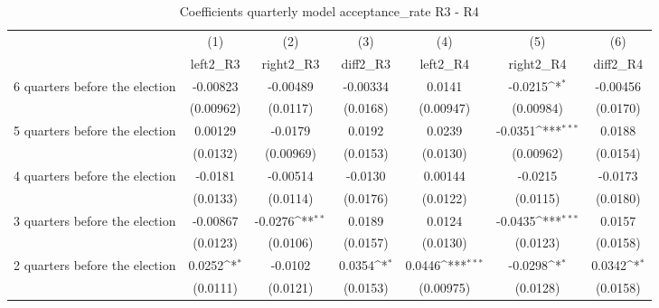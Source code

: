 \begin{table}[!ht]\centering \footnotesize
\def\sym#1{\ifmmode^{#1}\else\(^{#1}\)\fi}
\caption{Coefficients quarterly model acceptance\_rate R3 - R4}
\begin{tabular}{l*{6}{c}}
\hline\hline
                    &\multicolumn{1}{c}{(1)}&\multicolumn{1}{c}{(2)}&\multicolumn{1}{c}{(3)}&\multicolumn{1}{c}{(4)}&\multicolumn{1}{c}{(5)}&\multicolumn{1}{c}{(6)}\\
                    &\multicolumn{1}{c}{left2\_R3}&\multicolumn{1}{c}{right2\_R3}&\multicolumn{1}{c}{diff2\_R3}&\multicolumn{1}{c}{left2\_R4}&\multicolumn{1}{c}{right2\_R4}&\multicolumn{1}{c}{diff2\_R4}\\
\hline
 6 quarters before the election&    -0.00823         &    -0.00489         &    -0.00334         &      0.0141         &     -0.0215\sym{*}  &    -0.00456         \\
                    &   (0.00962)         &    (0.0117)         &    (0.0168)         &   (0.00947)         &   (0.00984)         &    (0.0170)         \\
[1em]
 5 quarters before the election&     0.00129         &     -0.0179         &      0.0192         &      0.0239         &     -0.0351\sym{***}&      0.0188         \\
                    &    (0.0132)         &   (0.00969)         &    (0.0153)         &    (0.0130)         &   (0.00962)         &    (0.0154)         \\
[1em]
 4 quarters before the election&     -0.0181         &    -0.00514         &     -0.0130         &     0.00144         &     -0.0215         &     -0.0173         \\
                    &    (0.0133)         &    (0.0114)         &    (0.0176)         &    (0.0122)         &    (0.0115)         &    (0.0180)         \\
[1em]
 3 quarters before the election&    -0.00867         &     -0.0276\sym{**} &      0.0189         &      0.0124         &     -0.0435\sym{***}&      0.0157         \\
                    &    (0.0123)         &    (0.0106)         &    (0.0157)         &    (0.0130)         &    (0.0123)         &    (0.0158)         \\
[1em]
 2 quarters before the election&      0.0252\sym{*}  &     -0.0102         &      0.0354\sym{*}  &      0.0446\sym{***}&     -0.0298\sym{*}  &      0.0342\sym{*}  \\
                    &    (0.0111)         &    (0.0121)         &    (0.0153)         &   (0.00975)         &    (0.0128)         &    (0.0158)         \\

\end{tabular}
\end{table}
